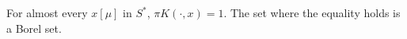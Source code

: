 For almost every $x [\mu]$ in $S^*$, $\pi K(\cdot, x) = 1$. The set where the equality holds is a Borel set.
